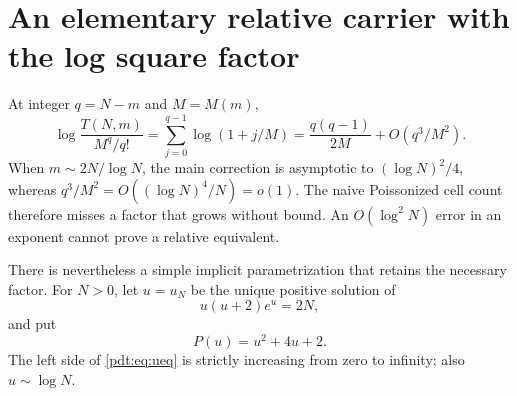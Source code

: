 \section{An elementary relative carrier with the log square factor}
\label{pdt:sec:elementary}
At integer $q=N-m$ and $M=M(m)$,
\begin{equation}\label{pdt:eq:log-square}
 \log\frac{T(N,m)}{M^q/q!}
 =\sum_{j=0}^{q-1}\log(1+j/M)
 =\frac{q(q-1)}{2M}+O(q^3/M^2).
\end{equation}
When $m\sim2N/\log N$, the main correction is asymptotic to $(\log N)^2/4$, whereas $q^3/M^2=O((\log N)^4/N)=o(1)$. The naive Poissonized cell count therefore misses a factor that grows without bound. An $O(\log^2N)$ error in an exponent cannot prove a relative equivalent.

There is nevertheless a simple implicit parametrization that retains the necessary factor. For $N>0$, let $u=u_N$ be the unique positive solution of
\begin{equation}\label{pdt:eq:ueq}
 u(u+2)e^u=2N,
\end{equation}
and put
\begin{equation}\label{pdt:eq:P}
 P(u)=u^2+4u+2.
\end{equation}
The left side of \eqref{pdt:eq:ueq} is strictly increasing from zero to infinity; also $u\sim\log N$.


